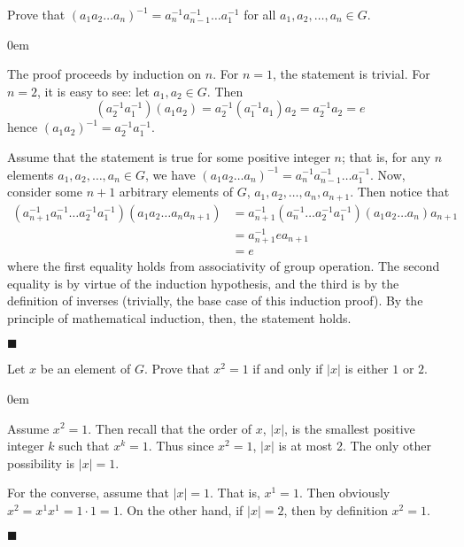 \documentclass[12pt]{article}
\renewcommand{\qed}{\hfill$\blacksquare$}
\renewenvironment{proof}{\begin{addmargin}[1em]{0em}\begin{newproof}}{\end{newproof}\end{addmargin}\qed}
\newenvironment{problem}[2][Exercise]{\begin{trivlist}
\item[\hskip \labelsep {\bfseries #1}\hskip \labelsep {\bfseries #2.}]}{\end{trivlist}}
\begin{document}
\begin{problem}{1.1.15}
Prove that $\left(a_1a_2\ldots a_n\right)^{-1}=a_n^{-1}a_{n-1}^{-1}\ldots a_1^{-1}$ for all $a_1,a_2,\ldots,a_n \in G$.
\end{problem}
\begin{proof}
The proof proceeds by induction on $n$. For $n=1$, the statement is trivial. For $n=2$, it is easy to see: let $a_1,a_2 \in G$. Then $$ \left(a_2^{-1}a_1^{-1}\right) \left(a_1a_2\right) = a_2^{-1}\left(a_1^{-1}a_1\right)a_2 = a_2^{-1}a_2 = e  $$ hence $\left(a_1a_2\right)^{-1}=a_2^{-1}a_1^{-1}$.

Assume that the statement is true for some positive integer $n$; that is, for any $n$ elements $a_1,a_2,\ldots,a_n \in G$, we have $\left(a_1a_2\ldots a_n\right)^{-1}=a_n^{-1}a_{n-1}^{-1}\ldots a_1^{-1}$. Now, consider some $n+1$ arbitrary elements of $G$, $a_1,a_2,\ldots,a_{n},a_{n+1}$. Then notice that
\begin{equation*}
    \begin{split}
        \left(a_{n+1}^{-1}a_n^{-1}\ldots a_2^{-1}a_1^{-1}\right)\left(a_1a_2\ldots a_n a_{n+1}\right) & = a_{n+1}^{-1}\left(a_n^{-1}\ldots a_2^{-1}a_1^{-1}\right)\left(a_1a_2\ldots a_n\right)a_{n+1} \\
        & = a_{n+1}^{-1} e a_{n+1} \\
        & = e
    \end{split}
\end{equation*}
where the first equality holds from associativity of group operation. The second equality is by virtue of the induction hypothesis, and the third is by the definition of inverses (trivially, the base case of this induction proof). By the principle of mathematical induction, then, the statement holds.
\end{proof}




\begin{problem}{1.1.16}
Let $x$ be an element of $G$. Prove that $x^2=1$ if and only if $\left|x\right|$ is either $1$ or $2$.
\end{problem}

\begin{proof}
Assume $x^2=1$. Then recall that the order of $x$, $\left|x\right|$, is the smallest positive integer $k$ such that $x^k=1$. Thus since $x^2 =1$, $\left|x\right|$ is at most 2. The only other possibility is $\left|x\right|=1$.

For the converse, assume that $\left|x\right|=1$. That is, $x^1=1$. Then obviously $x^2=x^1x^1 = 1\cdot 1 = 1$. On the other hand, if $\left|x\right|=2$, then by definition $x^2=1$.
\end{proof}
\end{document}
